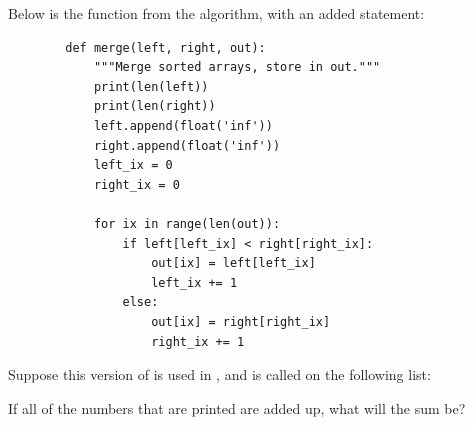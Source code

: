 \Needspace{5in}
\begin{prob}
    Below is the  function from the  algorithm,
    with an added  statement:

    \begin{verbatim}
        def merge(left, right, out):
            """Merge sorted arrays, store in out."""
            print(len(left))
            print(len(right))
            left.append(float('inf'))
            right.append(float('inf'))
            left_ix = 0
            right_ix = 0

            for ix in range(len(out)):
                if left[left_ix] < right[right_ix]:
                    out[ix] = left[left_ix]
                    left_ix += 1
                else:
                    out[ix] = right[right_ix]
                    right_ix += 1
    \end{verbatim}

    Suppose this version of  is used in , and 
     is called on the following list:

    \begin{center} 
        \python{[6, 2, 7, 1, 9, 3, 8, 5]}
    \end{center}

    If all of the numbers that are printed are added up, what will the sum be?

\end{prob}
